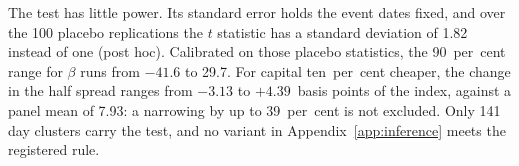 \documentclass[a4paper,fleqn]{cas-dc}
\begin{document}
The test has little power. Its standard error holds the event dates fixed, and over the 100 placebo replications the
$t$ statistic has a standard deviation of 1.82 instead of one (post hoc). Calibrated on those placebo
statistics, the 90~per~cent range for $\beta$ runs from $-41.6$ to 29.7. For capital ten~per~cent cheaper,
the change in the half spread ranges from $-3.13$ to $+4.39$~basis points of the index, against a
panel mean of 7.93: a narrowing by up to 39~per~cent is not excluded. Only 141 day clusters carry the test,
and no variant in Appendix~\ref{app:inference} meets the registered rule.
\end{document}
